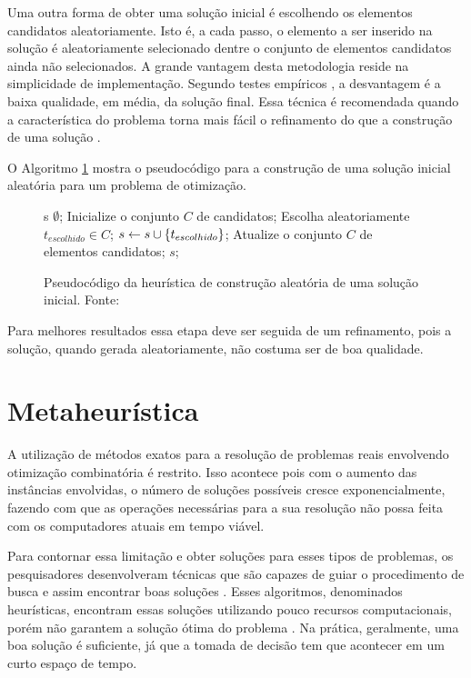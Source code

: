 Uma outra forma de obter uma solução inicial é escolhendo os elementos
candidatos aleatoriamente. Isto é, a cada passo, o elemento a ser inserido na
solução é aleatoriamente selecionado dentre o conjunto de elementos candidatos
ainda não selecionados. A grande vantagem desta metodologia reside na
simplicidade de implementação. Segundo testes empíricos , a desvantagem é a
baixa qualidade, em média, da solução final. Essa técnica é recomendada quando
a característica do problema torna mais fácil o refinamento do que a construção
de uma solução \cite{notasmarcone}.

O Algoritmo \ref{alg:heurconsaleatoria} mostra o pseudocódigo para a construção
de uma solução inicial aleatória para um problema de otimização.

\begin{figure}[h]
\caption{Pseudocódigo da heurística de construção aleatória de uma
solução inicial. \newline \mbox{Fonte:
\cite{notasmarcone}}}\label{alg:heurconsaleatoria}
\begin{programma}
\STATE s \GETS $\emptyset$;
\STATE Inicialize o conjunto $C$ de candidatos;
\STATE Escolha aleatoriamente $t_{escolhido} \in C$;
\STATE $s \leftarrow s \cup \{t_{escolhido}\}$;
\STATE Atualize o conjunto $C$ de elementos candidatos;
\ENDWHILE
\STATE\RETURN $s$;
\ENDALGORITHM
\end{programma}
\end{figure}

Para melhores resultados essa etapa deve ser seguida de um refinamento, pois a
solução, quando gerada aleatoriamente, não costuma ser de boa qualidade.

\section{Metaheurística}

A utilização de métodos exatos para a resolução de problemas reais envolvendo
otimização combinatória é restrito. Isso acontece pois com o aumento das
instâncias envolvidas, o número de soluções possíveis cresce exponencialmente,
fazendo com que as operações necessárias para a sua resolução não possa feita
com os computadores atuais em tempo viável.

Para contornar essa limitação e obter soluções para esses tipos de problemas,
os pesquisadores desenvolveram técnicas que são capazes de guiar o procedimento
de busca e assim encontrar boas soluções \cite{maritan2009}. Esses algoritmos,
denominados heurísticas, encontram essas soluções utilizando pouco recursos
computacionais, porém não garantem a solução ótima do problema \cite{dias2006}.
Na prática, geralmente, uma boa solução é suficiente, já que a tomada de
decisão tem que acontecer em um curto espaço de tempo.

